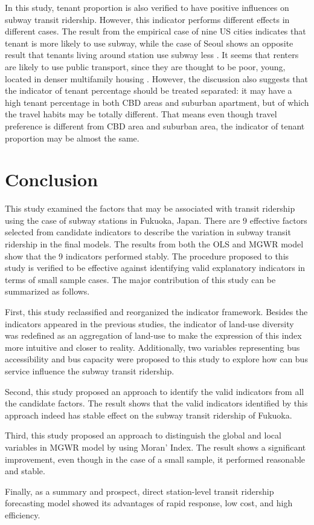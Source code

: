 %
In this study, tenant proportion is also verified to have positive influences on subway transit ridership. However, this indicator performs different effects in different cases. The result from the empirical case of nine US cities indicates that tenant is more likely to use subway, while the case of Seoul shows an opposite result that tenants living around station use subway less \cite{jun2015land,kuby2004factors}. It seems that renters are likely to use public transport, since they are thought to be poor, young, located in denser multifamily housing \cite{kuby2004factors}. However, the discussion also suggests that the indicator of tenant percentage should be treated separated: it may have a high tenant percentage in both CBD areas and suburban apartment, but of which the travel habits may be totally different. That means even though travel preference is different from CBD area and suburban area, the indicator of tenant proportion may be almost the same.


\section{Conclusion}
%
This study examined the factors that may be associated with transit ridership using the case of subway stations in Fukuoka, Japan. There are 9 effective factors selected from candidate indicators to describe the variation in subway transit ridership in the final models. The results from both the OLS and MGWR model show that the 9 indicators performed stably. The procedure proposed to this study is verified to be effective against identifying valid explanatory indicators in terms of small sample cases. The major contribution of this study can be summarized as follows.

%
First, this study reclassified and reorganized the indicator framework. Besides the indicators appeared in the previous studies, the indicator of land-use diversity was redefined as an aggregation of land-use to make the expression of this index more intuitive and closer to reality. Additionally, two variables representing bus accessibility and bus capacity were proposed to this study to explore how can bus service influence the subway transit ridership.

%
Second, this study proposed an approach to identify the valid indicators from all the candidate factors. The result shows that the valid indicators identified by this approach indeed has stable effect on the subway transit ridership of Fukuoka.

%
Third, this study proposed an approach to distinguish the global and local variables in MGWR model by using Moran’ Index. The result shows a significant improvement, even though in the case of a small sample, it performed reasonable and stable.

%
Finally, as a summary and prospect, direct station-level transit ridership forecasting model showed its advantages of rapid response, low cost, and high efficiency.

\clearpage %

% 
